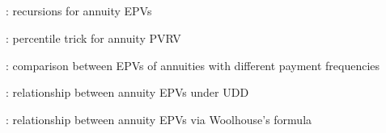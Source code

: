 \subsection*{}
\item {}: recursions for annuity EPVs
\item {}: percentile trick for annuity PVRV
\item {}: comparison between EPVs of annuities with different payment frequencies
\item {}: relationship between annuity EPVs under UDD
\item {}: relationship between annuity EPVs via Woolhouse's formula
